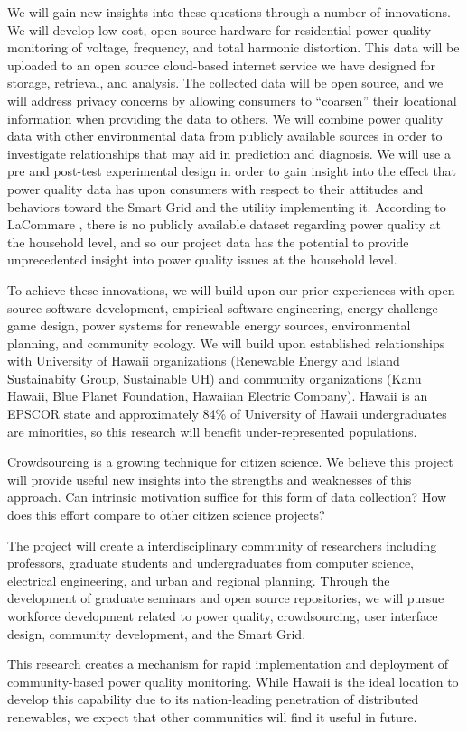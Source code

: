 We will gain new insights into these questions through a number of innovations.  We will develop low cost, open source hardware for residential power quality monitoring of voltage, frequency, and total harmonic distortion. This data will be uploaded to an open source cloud-based internet service we have designed for storage, retrieval, and analysis. The collected data will be open source, and we will address privacy concerns by allowing consumers to ``coarsen'' their locational information when providing the data to others.  We will combine power quality data with other environmental data from publicly available sources in order to investigate relationships that may aid in prediction and diagnosis.  We will use a pre and post-test experimental design in order to gain insight into the effect that power quality data has upon consumers with respect to their attitudes and behaviors toward the Smart Grid and the utility implementing it.  According to LaCommare \cite{LaCommare2004}, there is no publicly available dataset regarding power quality at the household level, and so our project data has the potential to provide unprecedented insight into power quality issues at the household level.

To achieve these innovations, we will build upon our prior experiences with open source software development, empirical software engineering, energy challenge game design, power systems for renewable energy sources, environmental planning, and community ecology. We will build upon established relationships with University of Hawaii organizations (Renewable Energy and Island Sustainabity Group, Sustainable UH) and community organizations (Kanu Hawaii, Blue Planet Foundation, Hawaiian Electric Company).  Hawaii is an EPSCOR state and approximately 84\% of University of Hawaii undergraduates are minorities, so this research will benefit under-represented populations.

Crowdsourcing is a growing technique for citizen science. We believe this project will provide useful new insights into the strengths and weaknesses of this approach. Can intrinsic motivation suffice for this form of data collection? How does this effort compare to other citizen science projects? 

The project will create a interdisciplinary community of researchers including professors, graduate students and undergraduates from computer science, electrical engineering, and urban and regional planning.  Through the development of graduate seminars and open source repositories, we will pursue workforce development related to power quality, crowdsourcing, user interface design, community development, and the Smart Grid.

This research creates a mechanism for rapid implementation and deployment of community-based power quality monitoring. While Hawaii is the ideal location to develop this capability due to its nation-leading penetration of distributed renewables, we expect that other communities will find it useful in future.




